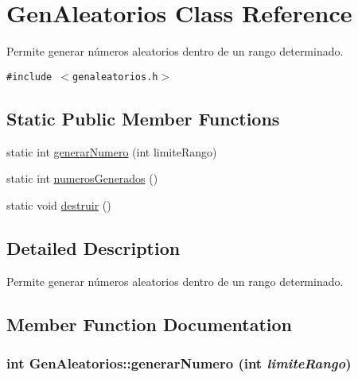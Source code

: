 \hypertarget{classGenAleatorios}{
\section{GenAleatorios Class Reference}
\label{classGenAleatorios}
}
Permite generar números aleatorios dentro de un rango determinado.  


{\tt \#include $<$genaleatorios.h$>$}

\subsection*{Static Public Member Functions}
\begin{CompactItemize}
\item 
static int \hyperlink{classGenAleatorios_817cbe02b82be9067b94996300b64b9c}{generarNumero} (int limiteRango)
\item 
static int \hyperlink{classGenAleatorios_1ca28fbc4c69c19d61d147abb04e67fb}{numerosGenerados} ()
\item 
static void \hyperlink{classGenAleatorios_702ffff747c51573caf3fb29fa16639b}{destruir} ()
\end{CompactItemize}


\subsection{Detailed Description}
Permite generar números aleatorios dentro de un rango determinado. 

\subsection{Member Function Documentation}
\hypertarget{classGenAleatorios_817cbe02b82be9067b94996300b64b9c}{
\subsubsection[generarNumero]{\setlength{\rightskip}{0pt plus 5cm}int GenAleatorios::generarNumero (int {\em limiteRango})}}
\label{classGenAleatorios_817cbe02b82be9067b94996300b64b9c}


